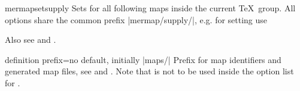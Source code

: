 \begin{docCommand}{mermapsetsupply}{}
  Sets  for all following maps inside the current \TeX\ group.
  All options share the common prefix |mermap/supply/|, e.g. for setting
   use
  \begin{dispListing}
  \end{dispListing}
  Also see  and .
\end{docCommand}


\begin{docMrcKey}{definition prefix}{=}{no default, initially |maps/|}
  Prefix for map identifiers and generated map files, see 
  and .
  Note that  is not to be used inside
  the option list for .
\end{docMrcKey}

